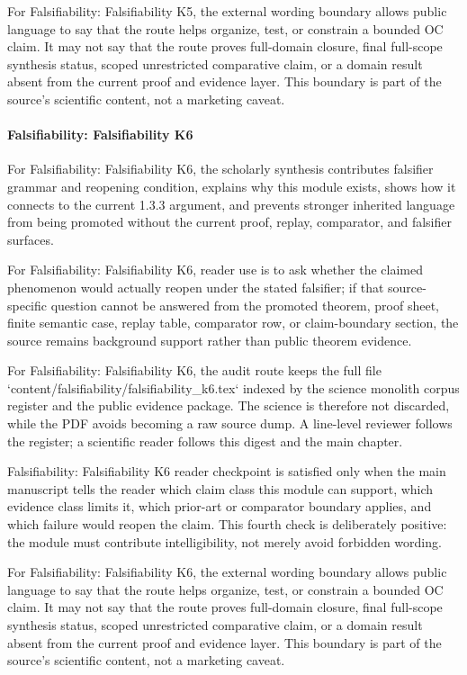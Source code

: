 For Falsifiability: Falsifiability K5, the external wording boundary allows public language to say that the route helps organize, test, or constrain a bounded OC claim. It may not say that the route proves full-domain closure, final full-scope synthesis status, scoped unrestricted comparative claim, or a domain result absent from the current proof and evidence layer. This boundary is part of the source's scientific content, not a marketing caveat.


\paragraph{Falsifiability: Falsifiability K6}

For Falsifiability: Falsifiability K6, the scholarly synthesis contributes falsifier grammar and reopening condition, explains why this module exists, shows how it connects to the current 1.3.3 argument, and prevents stronger inherited language from being promoted without the current proof, replay, comparator, and falsifier surfaces.


For Falsifiability: Falsifiability K6, reader use is to ask whether the claimed phenomenon would actually reopen under the stated falsifier; if that source-specific question cannot be answered from the promoted theorem, proof sheet, finite semantic case, replay table, comparator row, or claim-boundary section, the source remains background support rather than public theorem evidence.


For Falsifiability: Falsifiability K6, the audit route keeps the full file `content/falsifiability/falsifiability\_k6.tex` indexed by the science monolith corpus register and the public evidence package. The science is therefore not discarded, while the PDF avoids becoming a raw source dump. A line-level reviewer follows the register; a scientific reader follows this digest and the main chapter.


Falsifiability: Falsifiability K6 reader checkpoint is satisfied only when the main manuscript tells the reader which claim class this module can support, which evidence class limits it, which prior-art or comparator boundary applies, and which failure would reopen the claim. This fourth check is deliberately positive: the module must contribute intelligibility, not merely avoid forbidden wording.


For Falsifiability: Falsifiability K6, the external wording boundary allows public language to say that the route helps organize, test, or constrain a bounded OC claim. It may not say that the route proves full-domain closure, final full-scope synthesis status, scoped unrestricted comparative claim, or a domain result absent from the current proof and evidence layer. This boundary is part of the source's scientific content, not a marketing caveat.


